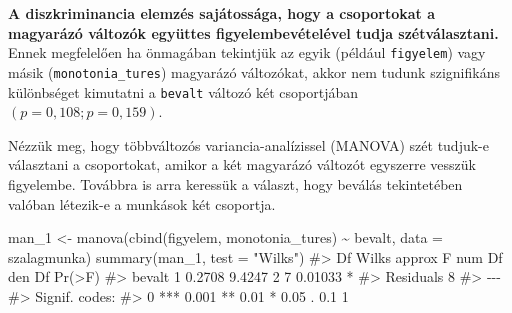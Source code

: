 \documentclass[
  letterpaper,
]{krantz}
\makeatletter
\newenvironment{Shaded}{\begin{snugshade}}{\end{snugshade}}
\newcommand{\AttributeTok}[1]{\textcolor[rgb]{0.40,0.45,0.13}{#1}}
\newcommand{\CommentTok}[1]{\textcolor[rgb]{0.37,0.37,0.37}{#1}}
\newcommand{\FunctionTok}[1]{\textcolor[rgb]{0.28,0.35,0.67}{#1}}
\newcommand{\NormalTok}[1]{\textcolor[rgb]{0.00,0.23,0.31}{#1}}
\newcommand{\OtherTok}[1]{\textcolor[rgb]{0.00,0.23,0.31}{#1}}
\newcommand{\SpecialCharTok}[1]{\textcolor[rgb]{0.37,0.37,0.37}{#1}}
\newcommand{\StringTok}[1]{\textcolor[rgb]{0.13,0.47,0.30}{#1}}
\newenvironment{kframe}{%
\medskip{}
\setlength{\fboxsep}{.8em}
 \def\at@end@of@kframe{}%
 \ifinner\ifhmode%
  \def\at@end@of@kframe{\end{minipage}}%
  \begin{minipage}{\columnwidth}%
 \fi\fi%
 \def\FrameCommand##1{\hskip\@totalleftmargin \hskip-\fboxsep
 \colorbox{shadecolor}{##1}\hskip-\fboxsep
     \hskip-\linewidth \hskip-\@totalleftmargin \hskip\columnwidth}%
 \MakeFramed {\advance\hsize-\width
   \@totalleftmargin\z@ \linewidth\hsize
   \@setminipage}}%
 {\par\unskip\endMakeFramed%
 \at@end@of@kframe}
\renewenvironment{Shaded}{\begin{kframe}}{\end{kframe}}
\makeatother
\begin{document}
\textbf{A diszkriminancia elemzés sajátossága, hogy a csoportokat a
magyarázó változók együttes figyelembevételével tudja szétválasztani.}
Ennek megfelelően ha önmagában tekintjük az egyik (például
\texttt{figyelem}) vagy másik (\texttt{monotonia\_tures}) magyarázó
változókat, akkor nem tudunk szignifikáns különbséget kimutatni a
\texttt{bevalt} változó két csoportjában \((p = 0,108; p=0,159)\).

\begin{Shaded}
\end{Shaded}

Nézzük meg, hogy többváltozós variancia-analízissel (MANOVA) szét
tudjuk-e választani a csoportokat, amikor a két magyarázó változót
egyszerre vesszük figyelembe. Továbbra is arra keressük a választ, hogy
beválás tekintetében valóban létezik-e a munkások két csoportja.

\begin{Shaded}
\begin{Highlighting}[]
\NormalTok{man\_1 }\OtherTok{\textless{}{-}} \FunctionTok{manova}\NormalTok{(}\FunctionTok{cbind}\NormalTok{(figyelem, monotonia\_tures) }\SpecialCharTok{\textasciitilde{}}\NormalTok{ bevalt, }\AttributeTok{data =}\NormalTok{ szalagmunka)}
\FunctionTok{summary}\NormalTok{(man\_1, }\AttributeTok{test =} \StringTok{"Wilks"}\NormalTok{)}
\CommentTok{\#\textgreater{}           Df  Wilks approx F num Df den Df  Pr(\textgreater{}F)  }
\CommentTok{\#\textgreater{} bevalt     1 0.2708   9.4247      2      7 0.01033 *}
\CommentTok{\#\textgreater{} Residuals  8                                        }
\CommentTok{\#\textgreater{} {-}{-}{-}}
\CommentTok{\#\textgreater{} Signif. codes:  }
\CommentTok{\#\textgreater{} 0 \textquotesingle{}***\textquotesingle{} 0.001 \textquotesingle{}**\textquotesingle{} 0.01 \textquotesingle{}*\textquotesingle{} 0.05 \textquotesingle{}.\textquotesingle{} 0.1 \textquotesingle{} \textquotesingle{} 1}
\end{Highlighting}
\end{Shaded}
\end{document}
